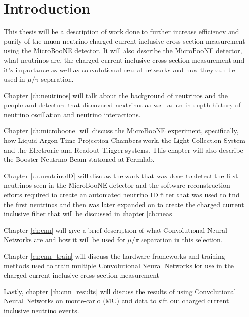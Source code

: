 \chapter{Introduction}
This thesis will be a description of work done to further increase efficiency and purity of the muon neutrino charged current inclusive cross section measurement using the MicroBooNE detector. It will also describe the MicroBooNE detector, what neutrinos are, the charged current inclusive cross section measurement and it's importance as well as convolutional neural networks and how they can be used in $\mu/\pi$ separation. 

Chapter \ref{ch:neutrinos} will talk about the background of neutrinos and the people and detectors that discovered neutrinos as well as an in depth history of neutrino oscillation and neutrino interactions. 

Chapter \ref{ch:microboone} will discuss the MicroBooNE experiment, specifically, how Liquid Argon Time Projection Chambers work, the Light Collection System and the Electronic and Readout Trigger systems. This chapter will also describe the Booster Neutrino Beam stationed at Fermilab.
 
Chapter \ref{ch:neutrinoID} will discuss the work that was done to detect the first neutrinos seen in the MicroBooNE detector and the software reconstruction efforts required to create an automated neutrino ID filter that was used to find the first neutrinos and then was later expanded on to create the charged current inclusive filter that will be discussed in chapter \ref{ch:meas}

Chapter \ref{ch:cnn} will give a brief description of what Convolutional Neural Networks are and how it will be used for $\mu/\pi$ separation in this selection.

Chapter \ref{ch:cnn_train} will discuss the hardware frameworks and training methods used to train multiple Convolutional Neural Networks for use in the charged current inclusive cross section measurement.

Lastly, chapter \ref{ch:cnn_results} will discuss the results of using Convolutional Neural Networks on monte-carlo (MC) and data to sift out charged current inclusive neutrino events. 
